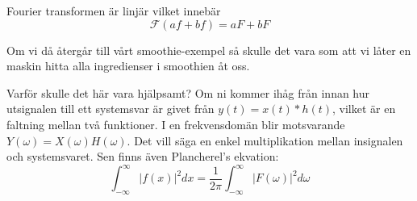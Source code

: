 \documentclass{article}
\begin{document}
Fourier transformen är linjär vilket innebär
$$\mathcal{F}(a f + b f) = a F + b F$$


Om vi då återgår till vårt smoothie-exempel så skulle det vara som att vi låter en maskin hitta alla ingredienser i smoothien åt oss.

Varför skulle det här vara hjälpsamt? Om ni kommer ihåg från innan hur utsignalen till ett systemsvar är givet från $y(t) = x(t) * h(t)$, vilket är en faltning mellan två funktioner. I en frekvensdomän blir motsvarande $Y(\omega) = X(\omega) H(\omega)$. Det vill säga en enkel multiplikation mellan insignalen och systemsvaret. Sen finns även Plancherel's ekvation: %
$$\int_{-\infty}^{\infty} |f(x)|^2 dx = \frac{1}{2 \pi}\int_{-\infty}^{\infty} |F(\omega)|^2 d\omega $$ %
\end{document}
